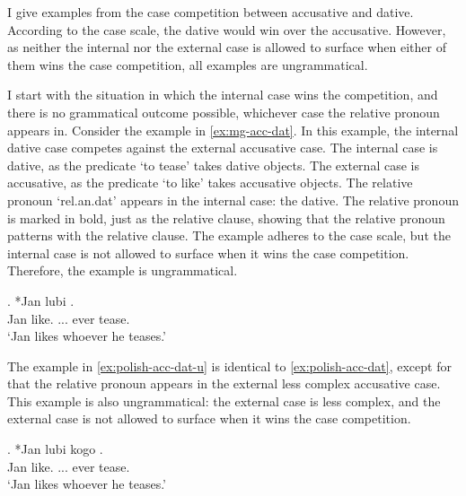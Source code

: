 I give examples from the case competition between accusative and dative. According to the case scale, the dative would win over the accusative. However, as neither the internal nor the external case is allowed to surface when either of them wins the case competition, all examples are ungrammatical.

I start with the situation in which the internal case wins the competition, and there is no grammatical outcome possible, whichever case the relative pronoun appears in.
Consider the example in \ref{ex:mg-acc-dat}. In this example, the internal dative case competes against the external accusative case.
The internal case is dative, as the predicate  `to tease' takes dative objects.
The external case is accusative, as the predicate  `to like' takes accusative objects.
The relative pronoun  `\ac{rel}.\ac{an}.\ac{dat}' appears in the internal case: the dative. The relative pronoun is marked in bold, just as the relative clause, showing that the relative pronoun patterns with the relative clause.
The example adheres to the case scale, but the internal case is not allowed to surface when it wins the case competition. Therefore, the example is ungrammatical.

\exg. *Jan lubi   .\\
Jan like.\scsub{[acc]} ... ever tease.\scsub{[dat]}\\
`Jan likes whoever he teases.' \label{ex:polish-acc-dat}

The example in \ref{ex:polish-acc-dat-u} is identical to \ref{ex:polish-acc-dat}, except for that the relative pronoun appears in the external less complex accusative case. This example is also ungrammatical: the external case is less complex, and the external case is not allowed to surface when it wins the case competition.

\exg. *Jan lubi kogo  .\\
Jan like.\scsub{[acc]} ... ever tease.\scsub{[dat]}\\
`Jan likes whoever he teases.' \label{ex:polish-acc-dat-u}

